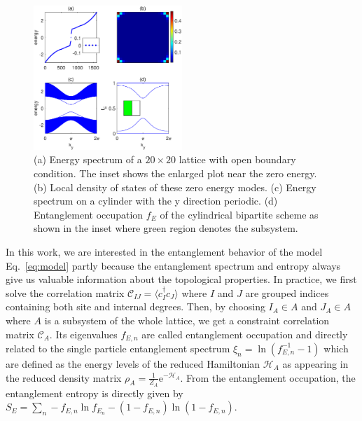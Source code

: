 \documentclass[doublecol]{epl2} %
\newcommand{\me}{\mathrm{e}}
\begin{document}
\begin{figure}
	\includegraphics[width=0.5\textwidth]{model.eps}
	\caption{\label{fig:model} (a) Energy spectrum of a $20\times20$ lattice with open boundary condition. The inset shows the enlarged plot near the zero energy. (b) Local density of states of these zero energy modes. (c) Energy spectrum on a cylinder with the y direction periodic. (d) Entanglement occupation $f_E$ of the cylindrical bipartite scheme as shown in the inset where green region denotes the subsystem. }
\end{figure}

In this work, we are interested in the entanglement behavior of the model Eq.~\ref{eq:model} partly because the entanglement spectrum and entropy always give us valuable information about the topological properties. In practice, we first solve the correlation matrix $\mathcal{C}_{IJ}=\langle c_I^\dag c_J \rangle$ where $I$ and $J$ are grouped indices containing both site and internal degrees. Then, by choosing $I_A\in A$ and $J_A\in A$ where $A$ is a subsystem of the whole lattice, we get a constraint correlation matrix $\mathcal{C}_A$. \cite{Peschel_JPAMG_2003, Ryu_PRB_2006} Its eigenvalues $f_{E,n}$ are called entanglement occupation and directly related to the single particle entanglement spectrum $\xi_n=\ln\left(f_{E,n}^{-1}-1\right)$ which are defined as the energy levels of the reduced Hamiltonian $\mathcal{H}_A$ as appearing in the reduced density matrix $\rho_A=\frac{1}{Z_A}\me^{-\mathcal{H}_A}$. From the entanglement occupation, the entanglement entropy is directly given by $S_E=\sum_n -f_{E,n}\ln f_{E_n} - (1-f_{E,n})\ln(1-f_{E,n}) $. 
\end{document}
